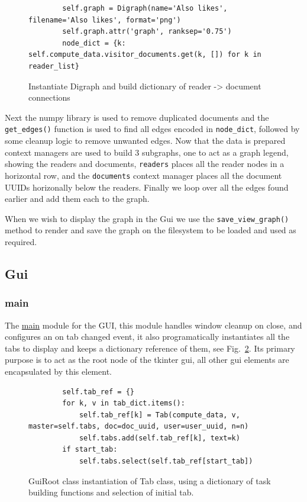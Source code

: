 \documentclass[11pt]{article}
\newcommand{\code}[1]{\colorbox{light-gray}{\texttt{#1}}}
\begin{document}
\begin{figure}[h]
    \begin{verbatim}
        self.graph = Digraph(name='Also likes', filename='Also likes', format='png')
        self.graph.attr('graph', ranksep='0.75')
        node_dict = {k: self.compute_data.visitor_documents.get(k, []) for k in reader_list}
    \end{verbatim}
    \caption{Instantiate Digraph and build dictionary of reader -> document connections}
    \label{fig:nodeDict}
\end{figure}

Next the numpy library is used to remove duplicated documents and the \code{get\_edges()} function is used to find all edges encoded in \code{node\_dict}, followed by some cleanup logic to remove unwanted edges.
Now that the data is prepared context managers are used to build 3 subgraphs, one to act as a graph legend, showing the readers and documents, \code{readers} places all the reader nodes in a horizontal row, and the \code{documents} context manager places all the document UUIDs horizonally below the readers.
Finally we loop over all the edges found earlier and add them each to the graph.

When we wish to display the graph in the Gui we use the \code{save\_view\_graph()} method to render and save the graph on the filesystem to be loaded and used as required.

\subsection{Gui}
\subsubsection{main}
The \href{https://www2.macs.hw.ac.uk/~sf52/DocuTrace/html/DocuTrace.Gui.html#module-DocuTrace.Gui.main}{main} module for the GUI, this module handles window cleanup on close, and configures an on tab changed event, it also programatically instantiates all the tabs to display and keeps a dictionary reference of them, see Fig.~\ref{fig:GuirootConstructor}. 
Its primary purpose is to act as the root node of the tkinter gui, all other gui elements are encapsulated by this element.

\begin{figure}[h]
    \begin{verbatim}
        self.tab_ref = {}
        for k, v in tab_dict.items():
            self.tab_ref[k] = Tab(compute_data, v, master=self.tabs, doc=doc_uuid, user=user_uuid, n=n)
            self.tabs.add(self.tab_ref[k], text=k)
        if start_tab:
            self.tabs.select(self.tab_ref[start_tab])
    \end{verbatim}
    \caption{GuiRoot class instantiation of Tab class, using a dictionary of task building functions and selection of initial tab.}
    \label{fig:GuirootConstructor}
\end{figure}
\end{document}
